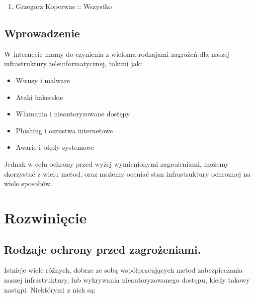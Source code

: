 \documentclass[12pt,a4paper]{article}
\begin{document}
\begin{enumerate}
    \item Grzegorz Koperwas :: Wszystko
\end{enumerate}

\newpage

\subsection{Wprowadzenie}

W internecie mamy do czynienia z wieloma rodzajami zagrożeń dla naszej
infrastruktury teleinformatycznej, takimi jak:

\begin{itemize}
	\item Wirusy i malware
	\item Ataki hakerskie
	\item Włamania i nieautoryzowane dostępy
	\item Phishing i oszustwa internetowe
	\item Awarie i błędy systemowe
\end{itemize}

Jednak w celu ochrony przed wyżej wymienionymi zagrożeniami, możemy skorzystać 
z wielu metod, oraz możemy oceniać stan infrastruktury ochronnej na wiele
sposobów.

\section{Rozwinięcie}

\subsection{Rodzaje ochrony przed zagrożeniami.}

Istnieje wiele różnych, dobrze ze sobą współpracujących metod zabezpieczania
naszej infrastruktury, lub wykrywania nieautoryzowanego dostępu, kiedy takowy
nastąpi. Niektórymi z nich są:
\end{document}
